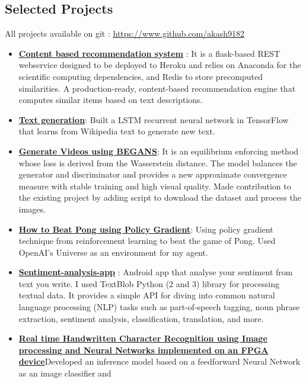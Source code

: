 \documentclass[margin, centered]{res}
\begin{document}
\begin{resume}
\section{Selected Projects}
All projects available on git : \url{https://www.github.com/akash9182}
\begin{itemize}[leftmargin=*]
\item \textbf{\href{https://github.com/akash9182/Product-recommendation-system}{Content based recommendation system}} : It is a flask-based REST webservice designed to be deployed to Heroku and relies on Anaconda for the scientific computing dependencies, and Redis to store precomputed similarities. A production-ready, content-based recommendation engine that computes similar items based on text descriptions.
\item \textbf{\href{https://github.com/akash9182/Text-generation}{Text generation}}: Built a LSTM recurrent neural network in TensorFlow that learns from Wikipedia text to generate new text. 
\item \textbf{\href{https://github.com/akash9182/BEGAN}{Generate Videos using BEGANS}}: It is an equilibrium enforcing method whose loss is derived from the Wasserstein distance. The model
balances the generator and discriminator and provides a new approximate convergence measure with stable training and high visual quality. Made contribution to the existing project by adding script to download the dataset and process the images.
\item \textbf{\href{https://github.com/akash9182/Pong-with-policy-gradinet}{How to Beat Pong using Policy Gradient}}: Using policy gradient technique from reinforcement learning to beat the game of Pong. Used OpenAI’s Universe as an environment for my agent.
\item \textbf{\href{https://github.com/akash9182/sentiment-analysis-mark1}{Sentiment-analysis-app}} : Android app that analyse your sentiment from text you write. I used TextBlob Python (2 and 3) library for processing textual data. It provides a simple API for diving into common natural language processing (NLP) tasks such as part-of-speech tagging, noun phrase extraction, sentiment analysis, classification, translation, and more. 
\item \textbf{\href{https://github.com/RiyanshKarani011235/handwriting-recognition-using-neural-networks-on-FPGA-final-year-project}{Real time Handwritten Character Recognition using Image processing and Neural Networks
implemented on an FPGA device}}Developed an inference model based on a feedforward Neural Network as an image classifier and

\end{itemize}
\end{resume}
\end{document}
